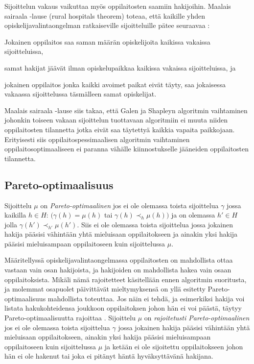 \documentclass[gradu, twoside]{tktltiki}
\begin{document}
Sijoittelun vakaus vaikuttaa myös oppilaitosten saamiin hakijoihin.
Maalais sairaala -lause (rural hospitals theorem) toteaa, että
kaikille yhden opiskelijavalintaongelman ratkaiseville sijoitteluille
pätee seuraavaa \cite{gusfield89}:

\begin{itemize*}
  \item Jokainen oppilaitos saa saman määrän opiskelijoita kaikissa
    vakaissa sijoitteluissa,
  \item samat hakijat jäävät ilman opiskelupaikkaa kaikissa vakaissa
    sijoitteluissa, ja
  \item jokainen oppilaitos jonka kaikki avoimet paikat eivät täyty,
    saa jokaisessa vakaassa sijoittelussa täsmälleen samat
    opiskelijat.
\end{itemize*}

Maalais sairaala -lause siis takaa, että Galen ja Shapleyn algoritmin
vaihtaminen johonkin toiseen vakaan sijoittelun tuottavaan algoritmiin
ei muuta niiden oppilaitosten tilannetta jotka eivät saa täytettyä
kaikkia vapaita paikkojaan. Erityisesti siis oppilaitospessimaalisen
algoritmin vaihtaminen oppilaitosoptimaaliseen ei paranna vähälle
kiinnostukselle jääneiden oppilaitosten tilannetta.

\subsection{Pareto-optimaalisuus}

Sijoittelu $\mu$ on \emph{Pareto-optimaalinen} jos ei ole olemassa
toista sijoittelua $\gamma$ jossa kaikilla $h \in H$: $(\gamma(h) =
\mu(h)$ tai $\gamma(h) \prec_h \mu(h))$ ja on olemassa $h' \in H$
jolla $\gamma(h') \prec_{h'} \mu(h')$. Siis ei ole olemassa toista
sijoittelua jossa jokainen hakija pääsisi vähintään yhtä mieluisaan
oppilaitokseen ja ainakin yksi hakija pääsisi mieluisampaan
oppilaitoseen kuin sijoittelussa $\mu$.

Määritellyssä opiskelijavalintaongelmassa oppilaitosten on mahdollista
ottaa vastaan vain osan hakijoista, ja hakijoiden on mahdollista hakea
vain osaan oppilaitoksista. Mikäli nämä rajoitetteet käsitellään ennen
algoritmin suoritusta, ja molemmat osapuolet päivittävät
mieltymyksensä on yllä esitetty Pareto-optimaalisuus mahdollista
toteuttaa. Jos näin ei tehdä, ja esimerkiksi hakija voi listata
hakukohteidensa joukkoon oppilaitoksen johon hän ei voi päästä, täytyy
Pareto-optimaalisuutta rajoittaa \cite{kojima10}. Sijoittelu $\mu$ on
\emph{rajoitetusti Pareto-optimaalinen} jos ei ole olemassa toista
sijoittelua $\gamma$ jossa jokainen hakija pääsisi vähintään yhtä
mieluisaan oppilaitokseen, ainakin yksi hakija pääsisi mieluisampaan
oppilaitoseen kuin sijoittelussa $\mu$ ja ketään ei ole sijoitettu
oppilaitokseen johon hän ei ole hakenut tai joka ei pitänyt häntä
hyväksyttävänä hakijana.
\end{document}
